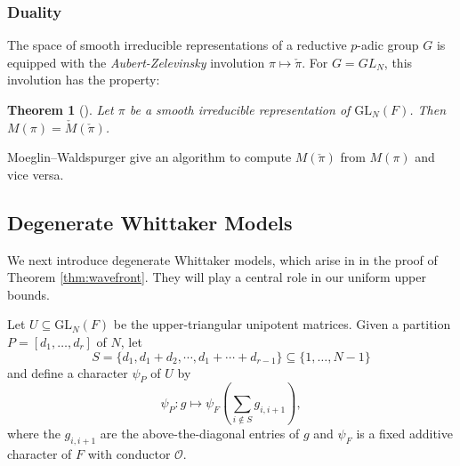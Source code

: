 \documentclass{amsart}
\newcommand{\lf}{\left}
\newcommand{\ri}{\right}
\newcommand{\mc}[1]{\mathcal{#1}}
\newcommand{\GL}{\mathrm{GL}}
\newcommand{\1}{\m 1}
\newtheorem{thm}{Theorem}[subsection]
\theoremstyle{remark}
\theoremstyle{definition}
\numberwithin{equation}{subsection}
\newcommand{\red}[1]{\textcolor{red}{#1}}
\newcommand{\blue}[1]{\textcolor{blue}{#1}}
\begin{document}







\subsubsection{Duality}
The space of smooth irreducible representations of a reductive $p$-adic group $G$ is equipped with the \emph{Aubert-Zelevinsky} involution $\pi \mapsto \check{\pi}$. For $G=GL_N$, this involution has the property:

\begin{thm}[{\cite[\S A.5]{LM16}}]\label{thm:dualsegment}
Let $\pi$ be a smooth irreducible representation of $\GL_N(F)$. Then $M(\pi) = \check M(\check \pi)$.  
\end{thm}

Moeglin--Waldspurger \cite{MW86} give an algorithm to compute $M(\check \pi)$ from $M(\pi)$ and vice versa. 








\subsection{Degenerate Whittaker Models}
We next introduce degenerate Whittaker models, which arise in \cite{MW87} in the proof  of Theorem \ref{thm:wavefront}. They will play a central role in our uniform upper bounds. 

Let $U \subseteq \GL_N(F)$ be the upper-triangular unipotent matrices. Given a partition $P = [d_1, \dotsc, d_r]$ of $N$, let 
\[
S = \{d_1, d_1 + d_2, \cdots, d_1 + \cdots + d_{r-1}\} \subseteq \{1, \dotsc, N-1\}
\]
and define a character $\psi_P$ of $U$ by
\[
\psi_P : g \mapsto \psi_F\lf(\sum_{i \notin S} g_{i,i+1} \ri),
\]
where the $g_{i,i+1}$ are the above-the-diagonal entries of $g$ and $\psi_F$ is a fixed additive character of $F$ with conductor $\mc O$.  
\end{document}
